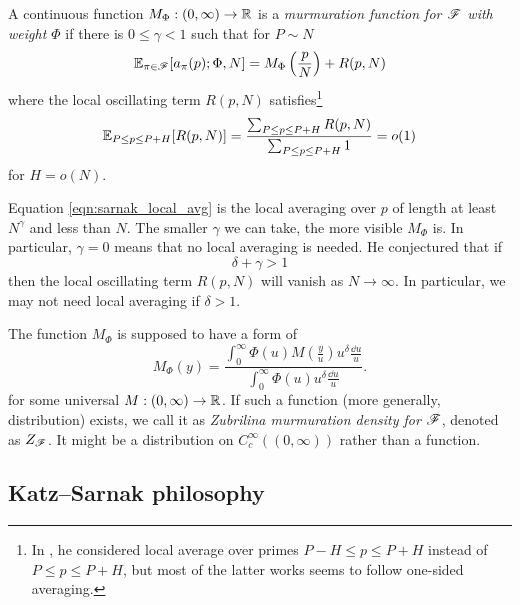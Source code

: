 \begin{definition}
A continuous function $M_\Phi : (0, \infty) \to \mathbb{R}$ is a \emph{murmuration function for $\mathscr{F}$ with weight $\Phi$} if there is $0 \le \gamma < 1$ such that for $P \sim N$
\begin{equation}
    \label{eqn:sarnak_murmuration}
    \mathbb{E}_{\pi \in \mathscr{F}} [a_\pi(p);\Phi, N] = M_\Phi\left(\frac{p}{N}\right) + R(p, N)
\end{equation}
where the local oscillating term $R(p, N)$ satisfies\footnote{In \cite{sarnak}, he considered local average over primes $P-H \le p \le P + H$ instead of $P \le p \le P + H$, but most of the latter works seems to follow one-sided averaging.}
\begin{equation}
    \label{eqn:sarnak_local_avg}
    \mathbb{E}_{P \le p \le P + H} [R(p, N)] = \frac{\sum_{P \le p \le P + H} R(p, N)}{\sum_{P \le p \le P + H} 1} = o(1)
\end{equation}
for $H = o(N)$.
\end{definition}
Equation \eqref{eqn:sarnak_local_avg} is the local averaging over $p$ of length at least $N^\gamma$ and less than $N$.
The smaller $\gamma$ we can take, the more visible $M_\Phi$ is.
In particular, $\gamma = 0$ means that no local averaging is needed.
He conjectured that if
\begin{equation}
    \label{eqn:sarnak_local_thres}
    \delta + \gamma > 1
\end{equation}
then the local oscillating term $R(p, N)$ will vanish as $N \to \infty$.
In particular, we may not need local averaging if $\delta > 1$.

The function $M_\Phi$ is supposed to have a form of
\begin{equation}
    \label{eqn:sarnak_zubrilina_density}
    M_\Phi(y) = \frac{\int_0^{\infty} \Phi(u) M\left(\frac{y}{u}\right) u^\delta \frac{\dd u}{u}}{\int_0^{\infty} \Phi(u) u^\delta \frac{\dd u}{u}}.
\end{equation}
for some universal $M : (0, \infty) \to \mathbb{R}$.
If such a function (more generally, distribution) exists, we call it as \emph{Zubrilina murmuration density for $\mathscr{F}$}, denoted as $Z_{\mathscr{F}}$.
It might be a distribution on $C_c^\infty((0, \infty))$ rather than a function.



\subsection{Katz--Sarnak philosophy}


